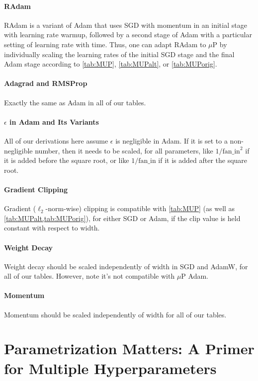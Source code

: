 \documentclass{article}
\theoremstyle{definition}
\newcommand{\fanin}{\mathrm{fan\_in}}
\begin{document}
\paragraph{RAdam}
RAdam \citep{liu-etal-2020-understanding} is a variant of Adam that uses SGD with momentum in an initial stage with learning rate warmup, followed by a second stage of Adam with a particular setting of learning rate with time.
Thus, one can adapt RAdam to $\mu$P by individually scaling the learning rates of the initial SGD stage and the final Adam stage according to \cref{tab:MUP}, \cref{tab:MUPalt}, or \cref{tab:MUPorig}.

\paragraph{Adagrad and RMSProp}
Exactly the same as Adam in all of our tables.

\paragraph{$\epsilon$ in Adam and Its Variants}
All of our derivations here assume $\epsilon$ is negligible in Adam.
If it is set to a non-negligible number, then it needs to be scaled, for all parameters, like $1/\fanin^2$ if it is added before the square root, or like $1/\fanin$ if it is added after the square root.

\paragraph{Gradient Clipping}
Gradient ($\ell_2$-norm-wise) clipping is compatible with \cref{tab:MUP} (as well as \cref{tab:MUPalt,tab:MUPorig}), for either SGD or Adam, if the clip value is held constant with respect to width.

\paragraph{Weight Decay}
Weight decay should be scaled independently of width in SGD and AdamW, for all of our tables.
However, note it's not compatible with $\mu$P Adam.

\paragraph{Momentum}
Momentum should be scaled independently of width for all of our tables.

\section{Parametrization Matters: A Primer for Multiple Hyperparameters}
\label{sec:primermulti}
\end{document}
